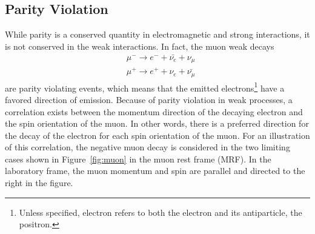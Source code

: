 \documentclass{outhesis}
\begin{document}

\subsection{Parity Violation}
\label{sec:pv}
While parity is a conserved quantity in electromagnetic and strong interactions, it is not conserved in the weak interactions. 
In fact, the muon weak decays
\begin{equation}
\begin{split}
&\mu^- \rightarrow {e^-} + \bar{\nu_e} + \nu_{\mu}\\
&\mu^+ \rightarrow {e^+} + \nu_e + \bar{\nu_{\mu}}
\label{eq:decay}
\end{split}
\end{equation}
are parity violating events, which means that the emitted electrons\footnote{Unless specified, electron refers to both the electron and its antiparticle, the positron.} have a favored direction of emission. 
Because of parity violation in weak processes, a correlation exists between the momentum direction of the decaying electron and the spin orientation of the muon. In other words, there is a preferred direction for the decay of the electron for each spin orientation of the muon. For an illustration of this correlation, the negative muon decay is considered in the two limiting cases shown in Figure~\ref{fig:muon} in the muon rest frame (MRF). In the laboratory frame, the muon momentum and spin are parallel and directed to the right in the figure. \\
\end{document}
